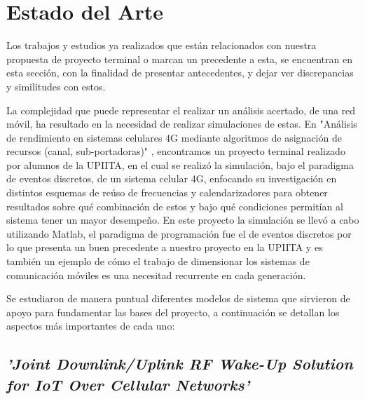 
\chapter{Estado del Arte} %

\label{Chapter3} %

Los trabajos y estudios ya realizados que están relacionados con nuestra propuesta de proyecto terminal o marcan un precedente a esta, se encuentran en esta sección, con la finalidad de presentar antecedentes, y dejar ver discrepancias y similitudes con estos.\newline

La complejidad que puede representar el realizar un análisis acertado, de una red móvil, ha resultado en la necesidad de realizar simulaciones de estas. En "Análisis de rendimiento en sistemas celulares 4G mediante algoritmos de asignación de recursos (canal, sub-portadoras)" \parencite{Celis2016}, encontramos un proyecto terminal realizado por alumnos de la UPIITA, en el cual se realizó la simulación, bajo el paradigma de eventos discretos, de un sistema celular 4G, enfocando su investigación en distintos esquemas de reúso de frecuencias y calendarizadores para obtener resultados sobre qué combinación de estos y bajo qué condiciones permitían al sistema tener un mayor desempeño. En este proyecto la simulación se llevó a cabo utilizando Matlab, el paradigma de programación fue el de eventos discretos por lo que presenta un buen precedente a nuestro proyecto en la UPIITA y es también un ejemplo de cómo el trabajo de dimensionar los sistemas de comunicación móviles es una necesitad recurrente en cada generación. \newline

Se estudiaron de manera puntual diferentes modelos de sistema que sirvieron de apoyo para fundamentar las bases del proyecto, a continuación se detallan los aspectos más importantes de cada uno:


\section{\textit{'Joint Downlink/Uplink RF Wake-Up Solution for IoT Over Cellular Networks'}}

